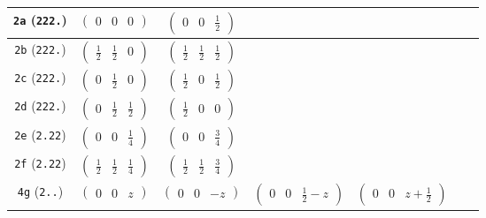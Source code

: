 \documentclass[fleqn,9pt,landscape]{jsarticle}
\begin{document}
\begin{center}
\begin{longtable}{ccccccc}
{\tt 2a} ({\tt 222.}) & $ \begin{pmatrix} 0 & 0 & 0 \end{pmatrix} $ & $ \begin{pmatrix} 0 & 0 & \frac{1}{2} \end{pmatrix} $ & $  $ & $  $ & $  $ & $  $ \\ \hline
{\tt 2b} ({\tt 222.}) & $ \begin{pmatrix} \frac{1}{2} & \frac{1}{2} & 0 \end{pmatrix} $ & $ \begin{pmatrix} \frac{1}{2} & \frac{1}{2} & \frac{1}{2} \end{pmatrix} $ & $  $ & $  $ & $  $ & $  $ \\ \hline
{\tt 2c} ({\tt 222.}) & $ \begin{pmatrix} 0 & \frac{1}{2} & 0 \end{pmatrix} $ & $ \begin{pmatrix} \frac{1}{2} & 0 & \frac{1}{2} \end{pmatrix} $ & $  $ & $  $ & $  $ & $  $ \\ \hline
{\tt 2d} ({\tt 222.}) & $ \begin{pmatrix} 0 & \frac{1}{2} & \frac{1}{2} \end{pmatrix} $ & $ \begin{pmatrix} \frac{1}{2} & 0 & 0 \end{pmatrix} $ & $  $ & $  $ & $  $ & $  $ \\ \hline
{\tt 2e} ({\tt 2.22}) & $ \begin{pmatrix} 0 & 0 & \frac{1}{4} \end{pmatrix} $ & $ \begin{pmatrix} 0 & 0 & \frac{3}{4} \end{pmatrix} $ & $  $ & $  $ & $  $ & $  $ \\ \hline
{\tt 2f} ({\tt 2.22}) & $ \begin{pmatrix} \frac{1}{2} & \frac{1}{2} & \frac{1}{4} \end{pmatrix} $ & $ \begin{pmatrix} \frac{1}{2} & \frac{1}{2} & \frac{3}{4} \end{pmatrix} $ & $  $ & $  $ & $  $ & $  $ \\ \hline
{\tt 4g} ({\tt 2..}) & $ \begin{pmatrix} 0 & 0 & z \end{pmatrix} $ & $ \begin{pmatrix} 0 & 0 & - z \end{pmatrix} $ & $ \begin{pmatrix} 0 & 0 & \frac{1}{2} - z \end{pmatrix} $ & $ \begin{pmatrix} 0 & 0 & z + \frac{1}{2} \end{pmatrix} $ & $  $ & $  $ \\ \hline

\end{longtable}
\end{center}
\end{document}
